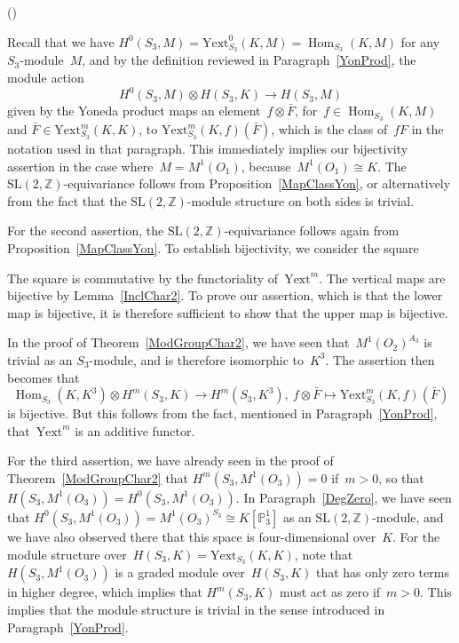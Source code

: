 \documentclass[12pt]{article}
\makeatletter
\newcounter{num}
\newenvironment{pflist}{\begin{list}{(\arabic{num})}{\usecounter{num} \leftmargin0cm \itemindent5pt}}{\end{list}}
\theoremstyle{definition}
\theoremstyle{break}
\renewenvironment{proof}[1][\proofname]{\par
\vspace{-5pt}%
\pushQED{\qed}%
\normalfont
\topsep0pt \partopsep0pt %
\trivlist
\item[\hskip\labelsep
\bfseries
#1\@addpunct{.}]\ignorespaces
}{%
\popQED\endtrivlist\@endpefalse
\addvspace{6pt plus 6pt} %
}
\newcommand{\Z}{\mathbb{Z}}
\DeclareMathOperator\Hom{Hom}
\DeclareMathOperator\id{id}
\newcommand{\SL}{\mathrm{SL}}
\renewcommand{\P}{\mathbb{P}}
\newcommand{\Yext}{\mathrm{Yext}}
\renewcommand{\1}{\mathbbm{1}}
\renewcommand{\P}{\mathbb{P}}
\newcommand{\ot}{\mathbin{\otimes}}
\makeatother
\begin{document}
\begin{proof}
\begin{pflist}
\item
Recall that we have $H^0(S_3, M) = \Yext_{S_3}^0(K,M) = \Hom_{S_3}(K,M)$ for any $S_3$-module~$M$, and by the definition reviewed in Paragraph~\ref{YonProd}, the module action
\[H^0(S_3, M) \ot H(S_3, K) \to H(S_3, M)\]
given by the Yoneda product maps an element~$f \ot \bar{F}$, for~$f \in \Hom_{S_3}(K,M)$ and \mbox{$\bar{F} \in \Yext_{S_3}^m(K,K)$}, to $\Yext_{S_3}^m(K,f)(\bar{F})$, which is the class of~$fF$ in the notation used in that paragraph. This immediately implies our bijectivity assertion in the case where~$M=M^1(O_1)$, because~$M^1(O_1) \cong K$. The $\SL(2, \Z)$-equivariance follows from Proposition~\ref{MapClassYon}, or alternatively from the fact that the $\SL(2, \Z)$-module structure on both sides is trivial.

\item
For the second assertion, the $\SL(2, \Z)$-equivariance follows again from Proposition~\ref{MapClassYon}. To establish bijectivity, we consider the square
\begin{center}
\end{center}
The square is commutative by the functoriality of~$\Yext^m$. The vertical maps are bijective by Lemma~\ref{InclChar2}. To prove our assertion, which is that the lower map is bijective, it is therefore sufficient to show that the upper map is bijective.

In the proof of Theorem~\ref{ModGroupChar2}, we have seen that~$M^1(O_2)^{A_3}$ is trivial as an $S_3$-module, and is therefore isomorphic to~$K^3$. The assertion then becomes that
\[\Hom_{S_3}(K, K^3) \ot H^m(S_3, K) \to H^m(S_3, K^3),~f \ot \bar{F}
\mapsto \Yext_{S_3}^m(K,f)(\bar{F})\]
is bijective. But this follows from the fact, mentioned in Paragraph~\ref{YonProd}, that~$\Yext^m$ is an additive functor.

\item
For the third assertion, we have already seen in the proof of Theorem~\ref{ModGroupChar2} that $H^m(S_3, M^1(O_3)) = 0$ if~$m>0$, so that
$H(S_3, M^1(O_3)) = H^0(S_3, M^1(O_3))$. In Paragraph~\ref{DegZero}, we have seen that
$H^0(S_3, M^1(O_3)) = M^1(O_3)^{S_3} \cong K[\P^1_3]$ as an $\SL(2, \Z)$-module, and we have also observed there that this space is four-dimensional over~$K$. For the module structure over~$H(S_3, K) = \Yext_{S_3}(K,K)$, note that $H(S_3, M^1(O_3))$ is a graded module over~$H(S_3, K)$ that has only zero terms in higher degree, which implies that $H^m(S_3, K)$ must act as zero if~$m>0$. This implies that the module structure is trivial in the sense introduced in Paragraph~\ref{YonProd}.
\qedhere
\end{pflist}
\end{proof}
\end{document}
